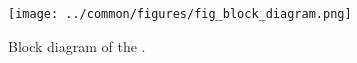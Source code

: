 \begin{figure}[h!]
   \begin{center}
        \texttt{[image: ../common/figures/fig\_block\_diagram.png]}
   \end{center}
   \caption{Block diagram of the \systemName.}
	\label{fig:block_diagram}
\end{figure}

